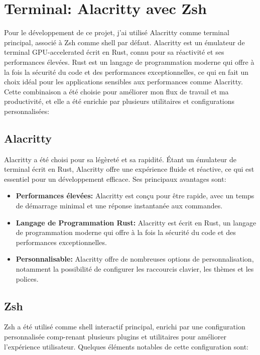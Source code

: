 \section{Terminal: Alacritty avec Zsh}

\hspace{16pt}Pour le développement de ce projet, j'ai utilisé Alacritty comme terminal principal, associé à Zsh comme shell par défaut. Alacritty est un émulateur de terminal GPU-accelerated écrit en Rust, connu pour sa réactivité et ses performances élevées. Rust est un langage de programmation moderne qui offre à la fois la sécurité du code et des performances exceptionnelles, ce qui en fait un choix idéal pour les applications sensibles aux performances comme Alacritty. Cette combinaison a été choisie pour améliorer mon flux de travail et ma productivité, et elle a été enrichie par plusieurs utilitaires et configurations personnalisées:

\subsection{Alacritty}

\hspace{16pt}Alacritty a été choisi pour sa légèreté et sa rapidité. Étant un émulateur de terminal écrit en Rust, Alacritty offre une expérience fluide et réactive, ce qui est essentiel pour un développement efficace. Ses principaux avantages sont:

\begin{itemize}
  \item \textbf{Performances élevées: }Alacritty est conçu pour être rapide, avec un temps de démarrage minimal et une réponse instantanée aux commandes.
  \item \textbf{Langage de Programmation Rust: }Alacritty est écrit en Rust, un langage de programmation moderne qui offre à la fois la sécurité du code et des performances exceptionnelles.
  \item \textbf{Personnalisable: }Alacritty offre de nombreuses options de personnalisation, notamment la possibilité de configurer les raccourcis clavier, les thèmes et les polices.
\end{itemize}

\subsection{Zsh}

\hspace{16pt}Zsh a été utilisé comme shell interactif principal, enrichi par une configuration personnalisée comp-renant plusieurs plugins et utilitaires pour améliorer l'expérience utilisateur. Quelques éléments notables de cette configuration sont:

